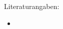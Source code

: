 \noindent Literaturangaben:
\begin{itemize}
\item 
\end{itemize}


\cleardoublepage
{} \setcounter{page}{1}

 
 
 
 
 

%
%
%
%
%
%
%
%
%
%
%
%
%
%
%
%
%
%
%
%
%
%
%
%

\printindex



